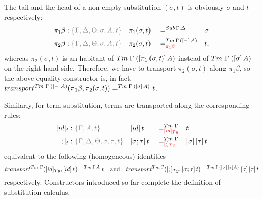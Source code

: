 \documentclass[a4paper,UKenglish,numberwithinsect,cleveref,thm-restate]{lipics-v2021}
\begin{document}
The tail and the head of a non-empty substitution $(\sigma, t)$ is obviously $\sigma$ and $t$ respectively:
\begin{alignat*}{5}
  \pi_1\beta      & : \implicit{\Gamma, \Delta, \Theta, \sigma, A, t} && \pi_1(\sigma , t)        && =^{\Sub\,\Gamma,\Delta} &&  \sigma \\
  \pi_2\beta      & : \implicit{\Gamma, \Delta, \Theta, \sigma, A, t} && \pi_2(\sigma , t)        && =^{\Tm\,\Gamma\,([\blank]\,A)}_{\alert{\pi_1\beta}} &&  t, 
\end{alignat*}
whereas $\pi_2(\sigma, t)$ is an habitant of $\Tm\;\Gamma\;([\pi_1\,(\sigma, t)]\,A)$ instead of $\Tm\;\Gamma\;([\sigma]\,A)$ on the right-hand side. 
Therefore, we have to transport $\pi_2(\sigma, t)$ along $\pi_1\beta$, so the above equality constructor is, in fact, $\transfib{\Tm\;\Gamma\;([\blank]\,A)}{\pi_1\beta}{\pi_2(\sigma, t)} =^{\Tm\;\Gamma\;([\sigma]\,A)} t$.

Similarly, for term substitution, terms are transported along the corresponding rules:
\begin{alignat*}{5}
  [\idS]_t         & : \implicit{\Gamma, A, t} && {[\idS]\,t}         && =^{\Tm\;\Gamma}_{\alert{[\idS]_\Ty}}  && t \\
  [;]_t            & : \implicit{\Gamma, \Delta, \Theta, \sigma, \tau, t} && {[\sigma ; \tau]\,t} && =^{\Tm\;\Gamma}_{\alert{[;]_{\Ty}}}   && {[ \sigma ]\,[ \tau ]\,t}
\end{alignat*}
equivalent to the following (homogeneous) identities
\[
  \transfib{\Tm\;\Gamma}{[\idS]_{\Ty}}{[\idS]\,t} =^{\Tm\,\Gamma\,A} t
  \quad\text{and}\quad
  \transfib{\Tm\;\Gamma}{[;]_{\Ty}}{[\sigma;\tau]\,t} =^{\Tm\,\Gamma\,([\sigma]\,[\tau]A)} [\sigma]\,[\tau]\,t
\]
respectively.
Constructors introduced so far complete the definition of substitution calculus.
\end{document}
